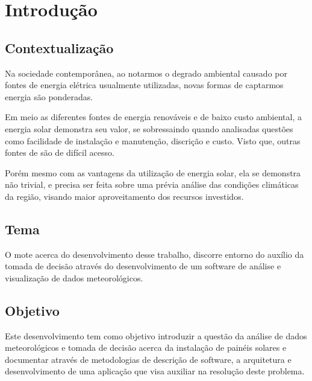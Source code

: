 \nocite{ddd_eric_evans}
\nocite{gof_patterns}
\nocite{sonda_project}
\nocite{nosql_distilled}
\nocite{js_async}

\chapter{Introdução}

\section{Contextualização}

Na sociedade contemporânea, ao notarmos o degrado ambiental causado por fontes de energia elétrica usualmente utilizadas, novas formas de captarmos energia são ponderadas.

Em meio as diferentes fontes de energia renováveis e de baixo custo ambiental, a energia solar demonstra seu valor, se sobressaindo quando analisadas questões como facilidade de instalação e manutenção, discrição e custo. Visto que, outras fontes de são de difícil acesso.

Porém mesmo com as vantagens da utilização de energia solar, ela se demonstra não trivial, e precisa ser feita sobre uma prévia análise das condições climáticas da região, visando maior aproveitamento dos recursos investidos.

\section{Tema}

O mote acerca do desenvolvimento desse trabalho, discorre entorno do auxílio da tomada de decisão através do desenvolvimento de um software de análise e visualização de dados meteorológicos.

\section{Objetivo}

Este desenvolvimento tem como objetivo introduzir a questão da análise de dados meteorológicos e tomada de decisão acerca da instalação de painéis solares e documentar através de metodologias de descrição de software, a arquitetura e desenvolvimento de uma aplicação que visa auxiliar na resolução deste problema.

